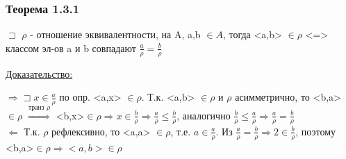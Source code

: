 \documentclass[12pt]{article}
\begin{document}
    \subsubsection*{Теорема 1.3.1}\label{th:1.3.1} 
    $\sqsupset$ $\rho$ - отношение эквивалентности, на A, a,b $\in A$, тогда <a,b> $\in \rho$
    <=> классом эл-ов a и b совпадают $\frac{a}{\rho}=\frac{b}{\rho}$\par\noindent
    \underline{Доказательство:}
    \begin{adjustwidth}{1.5em}{1.5em}
        $\Rightarrow \sqsupset x \in \frac{a}{\rho}$ по опр. <a,x> $\in \rho$. Т.к. <a,b>
        $\in \rho$ и $\rho$ асимметрично, то <b,a> $\in \rho$ $\overset{\text{транз $\rho$}}{\Rightarrow}$
        <b,x>$\in \rho \Rightarrow x \in \frac{b}{\rho} \Rightarrow \frac{a}{\rho}\leq \frac{b}{\rho}$,
        аналогично $\frac{b}{\rho}\leq\frac{a}{\rho} \Rightarrow \frac{a}{\rho}=\frac{b}{\rho}$\\
        $\Leftarrow$ Т.к. $\rho$ рефлексивно, то <a,a> $\in \rho$, т.е. $a \in \frac{a}{\rho}$. Из
        $\frac{a}{\rho}=\frac{b}{\rho} \Rightarrow 2 \in \frac{b}{\rho}$, поэтому <b,a>$\in \rho
        \Rightarrow <a,b> \in \rho$
    \end{adjustwidth}
\end{document}
